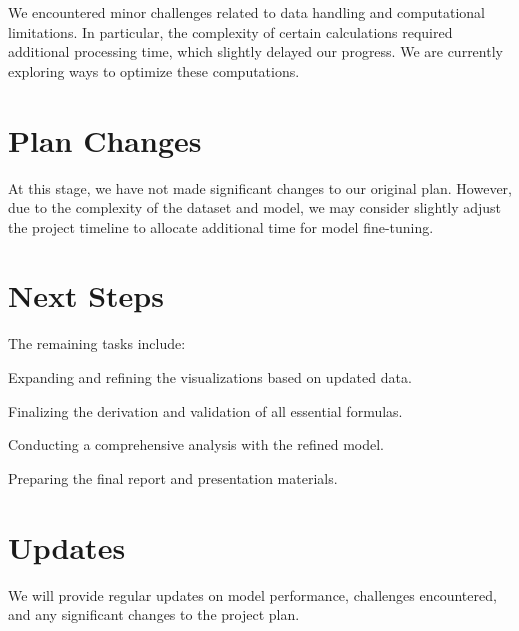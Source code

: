 \documentclass[10pt]{article}
\begin{document}
We encountered minor challenges related to data handling and computational
limitations. In particular, the complexity of certain calculations required
additional processing time, which slightly delayed our progress.
We are currently exploring ways to optimize these computations.


\section{Plan Changes}


At this stage, we have not made significant changes to our original plan.
However, due to the complexity of the dataset and model, we may consider
slightly adjust the project timeline to allocate additional time for
model fine-tuning.


\section{Next Steps}


The remaining tasks include:
\begin{enumerate*}[label = (\roman*)]
\item Expanding and refining the visualizations based on updated data.
\item Finalizing the derivation and validation of all essential formulas.
\item Conducting a comprehensive analysis with the refined model.
\item Preparing the final report and presentation materials.
\end{enumerate*}


\section{Updates}


We will provide regular updates on model performance, challenges encountered,
and any significant changes to the project plan.




\end{document}
